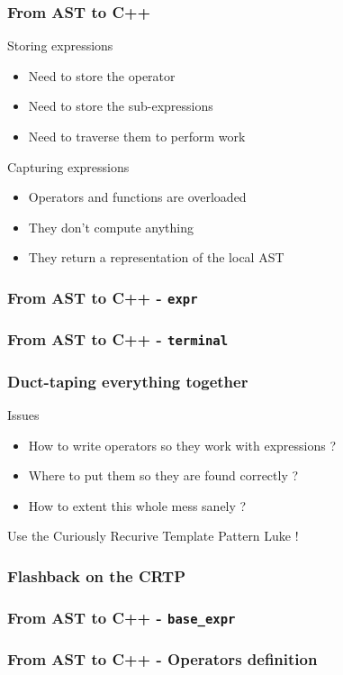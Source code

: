 \begin{frame}
\frametitle{From AST to C++}
\begin{block}{Storing expressions}
\begin{itemize}
\item Need to store the \alert{operator}
\item Need to store the \alert{sub-expressions}
\item Need to traverse them to perform work
\end{itemize}
\end{block}{}

\begin{block}{Capturing expressions}
\begin{itemize}
\item Operators and functions are overloaded
\item They don't compute anything
\item They return a \alert{representation} of the local AST
\end{itemize}
\end{block}{}
\end{frame}

\begin{frame}
\frametitle{From AST to C++ - \texttt{expr}}
\end{frame}

\begin{frame}
\frametitle{From AST to C++ - \texttt{terminal}}
\lstterminal
\end{frame}

\begin{frame}
\frametitle{Duct-taping everything together}
\begin{block}{Issues}
\begin{itemize}
\item How to write operators so they work with expressions ?
\item Where to put them so they are found correctly ?
\item How to extent this whole mess sanely ?
\end{itemize}
\end{block}{}

{
\begin{center}
Use the \alert{Curiously Recurive Template Pattern} Luke !
\end{center}
}
\end{frame}

\begin{frame}
\frametitle{Flashback on the CRTP}
\lstcrtp
\end{frame}

\begin{frame}
\frametitle{From AST to C++ - \texttt{base\_expr}}
\lstcrtpexpr
\end{frame}

\begin{frame}
\frametitle{From AST to C++ - Operators definition}
\lstcrtpop
\end{frame}

